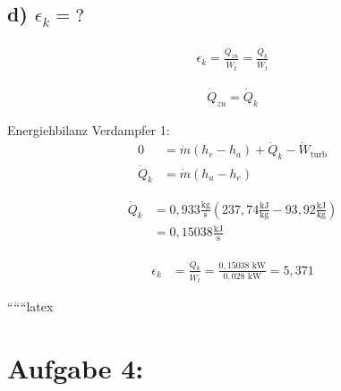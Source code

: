 \subsection*{d) $\epsilon_k = ?$}

\begin{align*}
\epsilon_k = \frac{\dot{Q}_{zu}}{\dot{W}_{t}} = \frac{\dot{Q}_{k}}{\dot{W}_{t}}
\end{align*}

\begin{align*}
\dot{Q}_{zu} = \dot{Q}_{k}
\end{align*}

Energiehbilanz Verdampfer 1:
\begin{align*}
0 &= \dot{m} (h_e - h_a) + \dot{Q}_{k} - \dot{W}_{\text{turb}} \\
\dot{Q}_{k} &= \dot{m} (h_a - h_e)
\end{align*}

\begin{align*}
\dot{Q}_{k} &= 0{,}933 \frac{\text{kg}}{\text{s}} (237{,}74 \frac{\text{kJ}}{\text{kg}} - 93{,}92 \frac{\text{kJ}}{\text{kg}}) \\
&= 0{,}15038 \frac{\text{kJ}}{\text{s}}
\end{align*}

\begin{align*}
\epsilon_k &= \frac{\dot{Q}_{k}}{\dot{W}_{t}} = \frac{0{,}15038 \text{ kW}}{0{,}028 \text{ kW}} = 5{,}371
\end{align*}

``````latex


\section*{Aufgabe 4:}